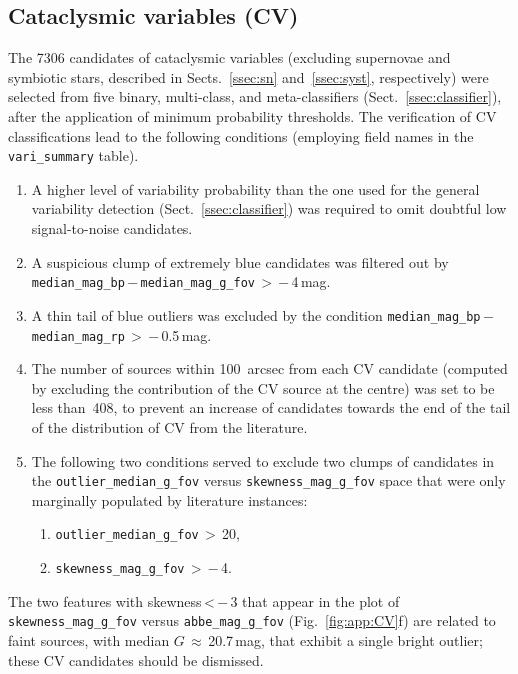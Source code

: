 \documentclass[longauth]{aa}
\def\g{$G$\xspace}
\begin{document}

\subsection{Cataclysmic variables (CV)\label{ssec:cv}}

The 7306 candidates of cataclysmic variables (excluding supernovae and symbiotic stars, described in Sects.~\ref{ssec:sn} and~\ref{ssec:syst}, respectively) were selected from five binary, multi-class, and meta-classifiers (Sect.~\ref{ssec:classifier}), after the application of minimum probability thresholds. The verification of CV classifications lead to the following conditions (employing field names in the \texttt{vari\_summary} table). 
\begin{enumerate}
    \item A higher level of variability probability than the one used for the general variability detection (Sect.~\ref{ssec:classifier}) was required to omit doubtful low signal-to-noise candidates. 
    \item A suspicious clump of extremely blue candidates was filtered out by \texttt{median\_mag\_bp}\,$-$\,\texttt{median\_mag\_g\_fov}\,$>$\,$-$\,4\,mag.
    \item A thin tail of blue outliers was excluded by the condition  \texttt{median\_mag\_bp}\,$-$\,\texttt{median\_mag\_rp}\,$>$\,$-$\,0.5\,mag. 
    \item The number of sources within 100~arcsec from each CV candidate (computed by excluding the contribution of the CV source at the centre) was set to be less than~408, to prevent an increase of candidates towards the end of the tail of the distribution of CV from the literature. 
    \item The following two conditions served to exclude two clumps of candidates in the \texttt{outlier\_median\_g\_fov} versus \texttt{skewness\_mag\_g\_fov} space that were only marginally populated by literature instances:
    \begin{enumerate}
        \item \texttt{outlier\_median\_g\_fov}\,$>$\,20,
         \item \texttt{skewness\_mag\_g\_fov}\,$>$\,$-$\,4.
    \end{enumerate}
\end{enumerate}
The two features with skewness\,<\,$-$\,3 that appear in the plot of \texttt{skewness\_mag\_g\_fov} versus \texttt{abbe\_mag\_g\_fov} (Fig.~\ref{fig:app:CV}f) are related to faint sources, with median \g\,$\approx$\,20.7\,mag, that exhibit a single bright outlier; these CV candidates should be dismissed. 
\end{document}

